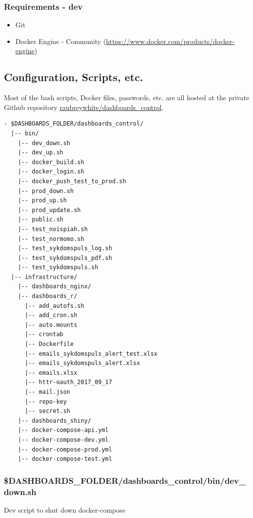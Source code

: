 \documentclass[12pt,]{article}
\providecommand{\tightlist}{%
  \setlength{\itemsep}{0pt}\setlength{\parskip}{0pt}}
\begin{document}
\subsubsection{Requirements - dev}\label{requirements---dev}

\begin{itemize}
\tightlist
\item
  Git
\item
  Docker Engine - Community
  (\url{https://www.docker.com/products/docker-engine})
\end{itemize}

\subsection{Configuration, Scripts,
etc.}\label{configuration-scripts-etc.}

Most of the bash scripts, Docker files, passwords, etc. are all hosted
at the private Github repository
\href{https://github.com/raubreywhite/dashboards_control}{raubreywhite/dashboards\_control}.

\begin{verbatim}
- $DASHBOARDS_FOLDER/dashboards_control/
  |-- bin/
    |-- dev_down.sh
    |-- dev_up.sh
    |-- docker_build.sh
    |-- docker_login.sh
    |-- docker_push_test_to_prod.sh
    |-- prod_down.sh
    |-- prod_up.sh
    |-- prod_update.sh
    |-- public.sh
    |-- test_noispiah.sh
    |-- test_normomo.sh
    |-- test_sykdomspuls_log.sh
    |-- test_sykdomspuls_pdf.sh
    |-- test_sykdomspuls.sh
  |-- infrastructure/
    |-- dashboards_nginx/
    |-- dashboards_r/
      |-- add_autofs.sh
      |-- add_cron.sh
      |-- auto.mounts
      |-- crontab
      |-- Dockerfile
      |-- emails_sykdomspuls_alert_test.xlsx
      |-- emails_sykdomspuls_alert.xlsx
      |-- emails.xlsx
      |-- httr-oauth_2017_09_17
      |-- mail.json
      |-- repo-key
      |-- secret.sh
    |-- dashboards_shiny/
    |-- docker-compose-api.yml
    |-- docker-compose-dev.yml
    |-- docker-compose-prod.yml
    |-- docker-compose-test.yml
\end{verbatim}

\subsubsection{\$DASHBOARDS\_FOLDER/dashboards\_control/bin/dev\_down.sh}\label{dashboards_folderdashboards_controlbindev_down.sh}

Dev script to shut down docker-compose
\end{document}
